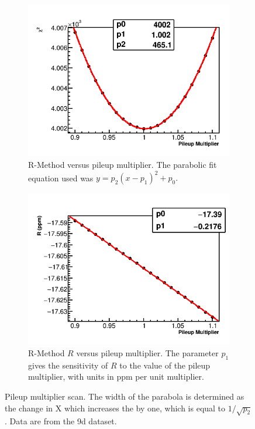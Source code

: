 \begin{figure}[h]
    \begin{subfigure}[t]{0.4\textwidth}
        \centering
        \includegraphics[width=\textwidth]{FullRatio_Chi2_Vs_PileupMultiplier_Canv}
        \caption{R-Method \chisq versus pileup multiplier. The parabolic fit equation used was $y = p_{2}(x - p_{1})^{2} + p_{0}.$}
    \end{subfigure}%
    \hspace{1cm}
    \begin{subfigure}[t]{0.4\textwidth}
        \centering
        \includegraphics[width=\textwidth]{FullRatio_R_Vs_PileupMultiplier_Canv}
        \caption{R-Method $R$ versus pileup multiplier. The parameter $p_{1}$ gives the sensitivity of $R$ to the value of the pileup multiplier, with units in ppm per unit multiplier.}
    \end{subfigure}
\caption[Pileup multiplier scan]{Pileup multiplier scan. The width of the parabola is determined as the change in X which increases the \chisq by one, which is equal to $1/\sqrt{p_{2}}$. Data are from the 9d dataset.}
\label{fig:PMscan}
\end{figure}


